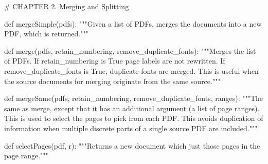 # CHAPTER 2. Merging and Splitting

def mergeSimple(pdfs):
    """Given a list of PDFs, merges the documents into a new PDF, which is
    returned."""

def merge(pdfs, retain_numbering, remove_duplicate_fonts):
    """Merges the list of PDFs. If retain_numbering is True page labels are not
    rewritten. If remove_duplicate_fonts is True, duplicate fonts are merged.
    This is useful when the source documents for merging originate from the
    same source."""

def mergeSame(pdfs, retain_numbering, remove_duplicate_fonts, ranges):
    """The same as merge, except that it has an additional argument (a list of
    page ranges). This is used to select the pages to pick from each PDF. This
    avoids duplication of information when multiple discrete parts of a single
    source PDF are included."""

def selectPages(pdf, r):
    """Returns a new document which just those pages in the page range."""
